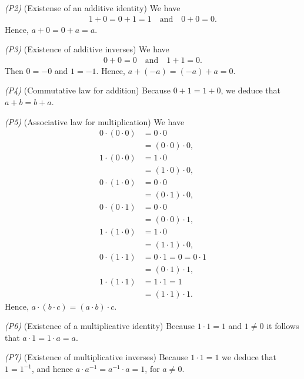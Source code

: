 \bigskip \emph{(P2)} (Existense of an additive identity) \enspace We have
\begin{align*}
	1 + 0 = 0 + 1 = 1 \quad \text{and} \quad  0 + 0 = 0.
\end{align*}
Hence, $a + 0 = 0 + a = a$.

\bigskip \emph{(P3)} (Existence of additive inverses) \enspace We have
\begin{align*}
	0 + 0 = 0 \quad \text{and} \quad 1 + 1 = 0.
\end{align*}
Then $0 = -0$ and $1 = -1$. Hence, $a + (-a) = (-a) + a = 0$.

\bigskip \emph{(P4)} (Commutative law for addition) \enspace Because $0 + 1 = 1 + 0$, we deduce that $a + b = b + a$.

\bigskip \emph{(P5)} (Associative law for multiplication) \enspace We have
\begin{align*}
	0 \cdot (0 \cdot 0) & = 0 \cdot 0                 \\
	                    & = (0 \cdot 0) \cdot 0,      \\
	1 \cdot (0 \cdot 0) & = 1 \cdot 0                 \\
	                    & = (1 \cdot 0) \cdot 0,      \\
	0 \cdot (1 \cdot 0) & = 0 \cdot 0                 \\
	                    & = (0 \cdot 1) \cdot 0,      \\
	0 \cdot (0 \cdot 1) & = 0 \cdot 0                 \\
	                    & = (0 \cdot 0) \cdot 1,      \\
	1 \cdot (1 \cdot 0) & = 1 \cdot 0                 \\
	                    & = (1 \cdot 1) \cdot 0,      \\
	0 \cdot (1 \cdot 1) & = 0 \cdot 1 = 0 = 0 \cdot 1 \\
	                    & = (0 \cdot 1) \cdot 1,      \\
	1 \cdot (1 \cdot 1) & = 1 \cdot 1 = 1             \\
	                    & = (1 \cdot 1) \cdot 1.
\end{align*}
Hence, $a \cdot (b \cdot c) = (a \cdot b) \cdot c$.

\bigskip \emph{(P6)} (Existence of a multiplicative identity) \enspace Because $1 \cdot 1 = 1$ and $1 \neq 0$ it follows that $a \cdot 1 = 1 \cdot a = a$.

\bigskip \emph{(P7)} (Existence of multiplicative inverses) \enspace Because $1 \cdot 1 = 1$ we deduce that $1 = 1^{-1}$, and hence
$a \cdot a^{-1} = a^{-1} \cdot a = 1$, for $a \neq 0$.

